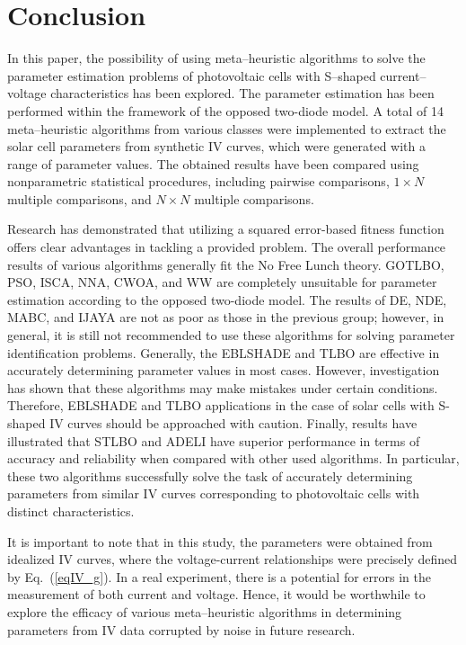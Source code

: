 \documentclass[a4paper,fleqn]{cas-sc}
\begin{document}
\section{Conclusion}\label{SecConsl}

In this paper, the possibility of using meta--heuristic algorithms
to solve the parameter estimation problems of photovoltaic cells
with S--shaped current--voltage characteristics has been explored.
The parameter estimation has been performed within the framework of the opposed two-diode model.
A total of 14 meta--heuristic algorithms from various classes were implemented
to extract the solar cell parameters from synthetic IV curves, which were generated with a range of parameter values.
The obtained results have been compared using nonparametric statistical procedures,
including pairwise comparisons, $1\times N$ multiple comparisons, and $N\times N$ multiple comparisons.

Research has demonstrated that utilizing a squared error-based fitness function offers clear advantages in tackling a provided problem.
The overall performance results of various algorithms generally fit the No Free Lunch theory.
GOTLBO, PSO, ISCA, NNA, CWOA, and WW are completely unsuitable for parameter estimation according to the opposed two-diode model.
The results of DE, NDE, MABC, and IJAYA are not as poor as those in the previous group;
however, in general, it is still not recommended to use these algorithms for solving parameter identification problems.
Generally, the EBLSHADE and TLBO are effective in accurately determining parameter values in most cases.
However, investigation has shown that these algorithms may make mistakes under certain conditions.
Therefore, EBLSHADE and TLBO applications in the case of solar cells with S-shaped IV curves should be approached with caution.
Finally, results have illustrated that STLBO and ADELI have superior performance in terms of accuracy and reliability
when compared with other used algorithms.
In particular, these two algorithms successfully solve the task of accurately determining parameters
from similar IV curves corresponding to photovoltaic cells with distinct characteristics.

It is important to note that in this study,
the parameters were obtained from idealized IV curves,
where the voltage-current relationships were precisely defined by Eq.~(\ref{eqIV_g}).
In a real experiment, there is a potential for errors in the measurement of both current and voltage.
Hence,  it would be worthwhile to explore the efficacy of various meta--heuristic algorithms
in determining parameters from IV data corrupted by noise in future research.
\end{document}
